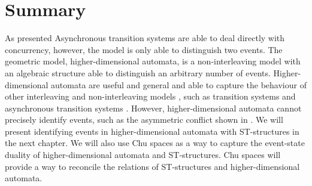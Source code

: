 \section{Summary}

As presented Asynchronous transition systems are able to deal directly with concurrency, however, the model is only able to distinguish two events. The geometric model, higher-dimensional automata, is a non-interleaving model with an algebraic structure able to distinguish an arbitrary number of events. Higher-dimensional automata are useful and general and able to capture the behaviour of other interleaving and non-interleaving models \cite{Goubault18RelationshipsModelsForConcurrency}, such as transition systems and asynchronous transition systems \cite{Fajstrup16DirectedAlgebraicTopologyConcurrency}. However, higher-dimensional automata cannot precisely identify events, such as the asymmetric conflict shown in \cite[Figure 5]{Johansen16STstruct}. We will present identifying events in higher-dimensional automata with ST-structures in the next chapter. We will also use Chu spaces as a way to capture the event-state duality of higher-dimensional automata and ST-structures. Chu spaces will provide a way to reconcile the relations of ST-structures and higher-dimensional automata. 